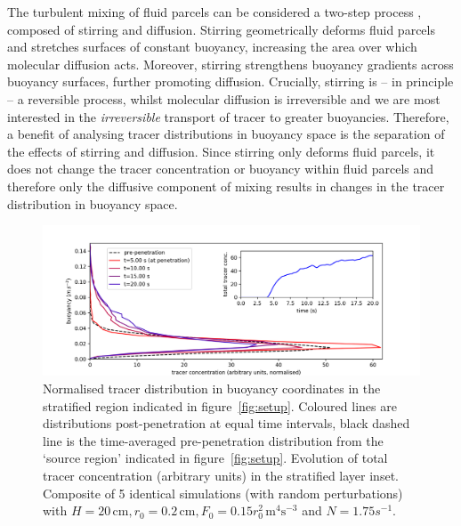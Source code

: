 \documentclass[a4paper]{article}
\begin{document}
The turbulent mixing of fluid parcels can be considered a two-step process \citep{wykes2014}, composed of
stirring and diffusion. Stirring geometrically deforms fluid parcels and stretches surfaces of
constant buoyancy, increasing the area over which molecular diffusion acts. Moreover, stirring strengthens
buoyancy gradients across buoyancy surfaces, further promoting diffusion. Crucially, stirring is -- in
principle -- a reversible process, whilst molecular diffusion is irreversible and we are most interested in
the \emph{irreversible} transport of tracer to greater buoyancies.  Therefore, a benefit of analysing tracer
distributions in buoyancy space is the separation of the effects of stirring and diffusion. Since stirring
only deforms fluid parcels, it does not change the tracer concentration or buoyancy within fluid parcels and
therefore only the diffusive component of mixing results in changes in the tracer distribution in buoyancy
space. 
\begin{figure}
	\centering
	\includegraphics[width=.6\textwidth]{tb_dist}
	\caption{Normalised tracer distribution in buoyancy coordinates in the stratified region indicated in
		figure~\ref{fig:setup}. Coloured lines are distributions post-penetration at equal time intervals,
		black dashed line is the time-averaged pre-penetration distribution from the `source region' indicated
		in figure~\ref{fig:setup}. Evolution of total tracer concentration (arbitrary units) in the stratified
		layer inset. Composite of 5 identical simulations (with random perturbations) with $H =
		20\,\mathrm{cm}, r_0 = 0.2 \, \mathrm{cm}, F_0 = 0.15r_0^2 \, \mathrm{m}^4 \mathrm{s}^{-3}$ and $N =
		1.75 s^{-1}$.}
	\label{fig:tbdist}
\end{figure}
\end{document}
